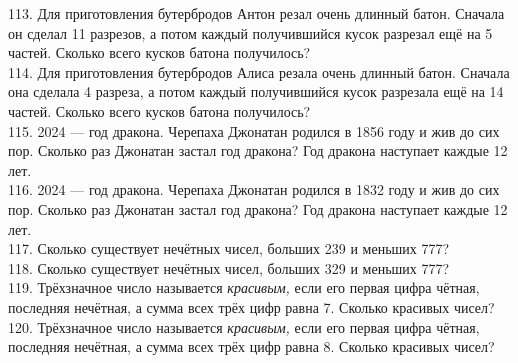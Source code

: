 113. Для приготовления бутербродов Антон резал очень длинный батон. Сначала он сделал 11 разрезов, а потом каждый получившийся кусок разрезал ещё на 5 частей. Сколько всего кусков батона получилось?\\
114. Для приготовления бутербродов Алиса резала очень длинный батон. Сначала она сделала 4 разреза, а потом каждый получившийся кусок разрезала ещё на 14 частей. Сколько всего кусков батона получилось?\\
115. 2024 --- год дракона. Черепаха Джонатан родился в 1856 году и жив до сих пор. Сколько раз Джонатан застал год дракона? Год дракона наступает каждые 12 лет.\\
116. 2024 --- год дракона. Черепаха Джонатан родился в 1832 году и жив до сих пор. Сколько раз Джонатан застал год дракона? Год дракона наступает каждые 12 лет.\\
117. Сколько существует нечётных чисел, больших 239 и меньших 777?\\
118. Сколько существует нечётных чисел, больших 329 и меньших 777?\\
119. Трёхзначное число называется {\it красивым,} если его первая цифра чётная, последняя нечётная, а сумма всех трёх цифр равна 7. Сколько красивых чисел?\\
120. Трёхзначное число называется {\it красивым,} если его первая цифра чётная, последняя нечётная, а сумма всех трёх цифр равна 8. Сколько красивых чисел?
\newpage
